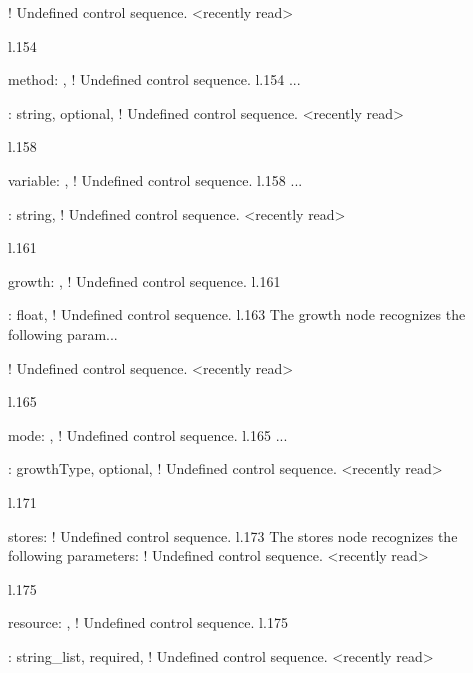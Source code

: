 {{{{{{! Undefined control sequence.
<recently read> \xmlAttr 
                         
l.154                   \item \xmlAttr
                                      {method}: ,
! Undefined control sequence.
l.154 ...         \item {}: \xmlDesc
                                                  {string, optional},
! Undefined control sequence.
<recently read> \xmlNode 
                         
l.158             \item \xmlNode
                                {variable}: ,
! Undefined control sequence.
l.158 ...       \item {}: \xmlDesc
                                                  {string},
! Undefined control sequence.
<recently read> \xmlNode 
                         
l.161             \item \xmlNode
                                {growth}: ,
! Undefined control sequence.
l.161             \item {}: \xmlDesc
                                                  {float},
! Undefined control sequence.
l.163               The \xmlNode
                                {growth} node recognizes the following param...

! Undefined control sequence.
<recently read> \xmlAttr 
                         
l.165                   \item \xmlAttr
                                      {mode}: ,
! Undefined control sequence.
l.165 ...           \item {}: \xmlDesc
                                                  {growthType, optional},
! Undefined control sequence.
<recently read> \xmlNode 
                         
l.171     \item \xmlNode
                        {stores}:
! Undefined control sequence.
l.173       The \xmlNode
                        {stores} node recognizes the following parameters:
! Undefined control sequence.
<recently read> \xmlAttr 
                         
l.175           \item \xmlAttr
                              {resource}: ,
! Undefined control sequence.
l.175           \item {}: \xmlDesc
                                                  {string\_list, required},
! Undefined control sequence.
<recently read> \xmlAttr 
                         
}}}}}}
